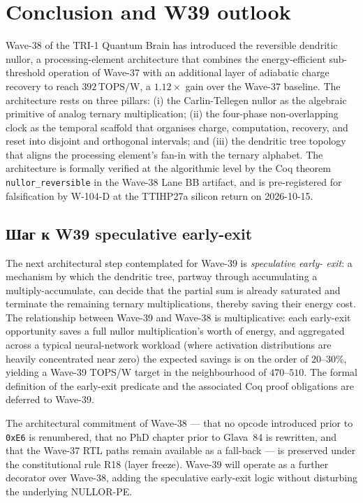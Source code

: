\section{Conclusion and W39 outlook}
\label{sec:conclusion}

Wave-38 of the TRI-1 Quantum Brain has introduced the reversible dendritic nullor,
a processing-element architecture that combines the energy-efficient sub-threshold
operation of Wave-37 with an additional layer of adiabatic charge recovery to reach
$392\,\text{TOPS/W}$, a $1.12\times$ gain over the Wave-37 baseline.  The
architecture rests on three pillars: (i) the Carlin-Tellegen nullor
\cite{carlin1964singular,tellegen1966nullor} as the algebraic primitive of analog
ternary multiplication; (ii) the four-phase non-overlapping clock as the temporal
scaffold that organises charge, computation, recovery, and reset into disjoint and
orthogonal intervals; and (iii) the dendritic tree topology that aligns the
processing element's fan-in with the ternary alphabet.  The architecture is
formally verified at the algorithmic level by the Coq theorem
\texttt{nullor\_reversible} in the Wave-38 Lane BB artifact, and is
pre-registered for falsification by W-104-D at the TTIHP27a silicon return on
2026-10-15.

\subsection{Шаг к W39 speculative early-exit}
\label{subsec:w39_outlook}

The next architectural step contemplated for Wave-39 is \emph{speculative early-
exit}: a mechanism by which the dendritic tree, partway through accumulating a
multiply-accumulate, can decide that the partial sum is already saturated and
terminate the remaining ternary multiplications, thereby saving their energy cost.
The relationship between Wave-39 and Wave-38 is multiplicative: each early-exit
opportunity saves a full nullor multiplication's worth of energy, and aggregated
across a typical neural-network workload (where activation distributions are
heavily concentrated near zero) the expected savings is on the order of $20$--$30\%$,
yielding a Wave-39 TOPS/W target in the neighbourhood of $470$--$510$.  The
formal definition of the early-exit predicate and the associated Coq proof
obligations are deferred to Wave-39.

The architectural commitment of Wave-38 --- that no opcode introduced prior to
\texttt{0xE6} is renumbered, that no PhD chapter prior to Glava~84 is rewritten,
and that the Wave-37 RTL paths remain available as a fall-back --- is preserved
under the constitutional rule R18 (layer freeze).  Wave-39 will operate as a
further decorator over Wave-38, adding the speculative early-exit logic without
disturbing the underlying NULLOR-PE.


